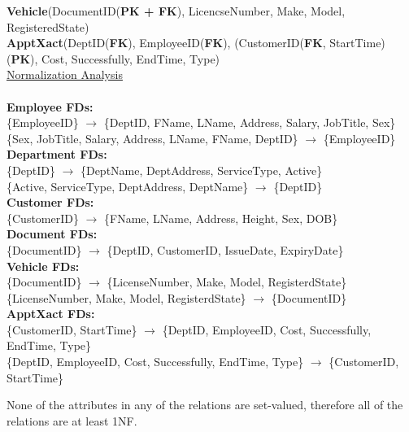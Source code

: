 \documentclass[12pt]{article}   %
\begin{document}
\textbf{Vehicle}(DocumentID(\textbf{PK + FK}), LicencseNumber, Make, Model, RegisteredState)\\

\textbf{ApptXact}(DeptID(\textbf{FK}), EmployeeID(\textbf{FK}), (CustomerID(\textbf{FK}, StartTime)(\textbf{PK}), Cost, Successfully, EndTime, Type)\\

\underline{Normalization Analysis}\\
\\
\textbf{Employee FDs:}\\
\{EmployeeID\} $\longrightarrow$ \{DeptID, FName, LName, Address, Salary, JobTitle, Sex\}\\
\{Sex, JobTitle, Salary, Address, LName, FName, DeptID\} $\longrightarrow$ \{EmployeeID\}\\

\textbf{Department FDs:}\\
\{DeptID\} $\longrightarrow$ \{DeptName, DeptAddress, ServiceType, Active\}\\
\{Active, ServiceType, DeptAddress, DeptName\} $\longrightarrow$ \{DeptID\}\\

\textbf{Customer FDs:}\\
\{CustomerID\} $\longrightarrow$ \{FName, LName, Address, Height, Sex, DOB\}\\

\textbf{Document FDs:}\\
\{DocumentID\} $\longrightarrow$ \{DeptID, CustomerID, IssueDate, ExpiryDate\}\\

\textbf{Vehicle FDs:}\\
\{DocumentID\} $\longrightarrow$ \{LicenseNumber, Make, Model, RegisterdState\}\\
\{LicenseNumber, Make, Model, RegisterdState\} $\longrightarrow$ \{DocumentID\}\\

\textbf{ApptXact FDs:}\\
\{CustomerID, StartTime\} $\longrightarrow$ \{DeptID, EmployeeID, Cost, Successfully, EndTime, Type\}\\
\{DeptID, EmployeeID, Cost, Successfully, EndTime, Type\} $\longrightarrow$ \{CustomerID, StartTime\}

None of the attributes in any of the relations are set-valued, therefore all of the relations are at least 1NF.\\
\end{document}
